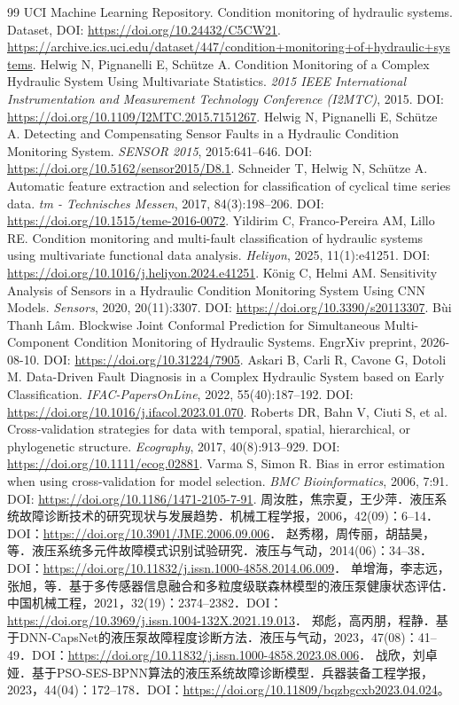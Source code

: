 \documentclass[UTF8,12pt,a4paper]{ctexart}
\begin{document}
\begin{thebibliography}{99}
 UCI Machine Learning Repository. Condition monitoring of hydraulic systems. Dataset, DOI: \url{https://doi.org/10.24432/C5CW21}. \url{https://archive.ics.uci.edu/dataset/447/condition+monitoring+of+hydraulic+systems}.
 Helwig N, Pignanelli E, Schütze A. Condition Monitoring of a Complex Hydraulic System Using Multivariate Statistics. \emph{2015 IEEE International Instrumentation and Measurement Technology Conference (I2MTC)}, 2015. DOI: \url{https://doi.org/10.1109/I2MTC.2015.7151267}.
 Helwig N, Pignanelli E, Schütze A. Detecting and Compensating Sensor Faults in a Hydraulic Condition Monitoring System. \emph{SENSOR 2015}, 2015:641–646. DOI: \url{https://doi.org/10.5162/sensor2015/D8.1}.
 Schneider T, Helwig N, Schütze A. Automatic feature extraction and selection for classification of cyclical time series data. \emph{tm - Technisches Messen}, 2017, 84(3):198–206. DOI: \url{https://doi.org/10.1515/teme-2016-0072}.
 Yildirim C, Franco-Pereira AM, Lillo RE. Condition monitoring and multi-fault classification of hydraulic systems using multivariate functional data analysis. \emph{Heliyon}, 2025, 11(1):e41251. DOI: \url{https://doi.org/10.1016/j.heliyon.2024.e41251}.
 König C, Helmi AM. Sensitivity Analysis of Sensors in a Hydraulic Condition Monitoring System Using CNN Models. \emph{Sensors}, 2020, 20(11):3307. DOI: \url{https://doi.org/10.3390/s20113307}.
 Bùi Thanh Lâm. Blockwise Joint Conformal Prediction for Simultaneous Multi-Component Condition Monitoring of Hydraulic Systems. EngrXiv preprint, 2026-08-10. DOI: \url{https://doi.org/10.31224/7905}.
 Askari B, Carli R, Cavone G, Dotoli M. Data-Driven Fault Diagnosis in a Complex Hydraulic System based on Early Classification. \emph{IFAC-PapersOnLine}, 2022, 55(40):187–192. DOI: \url{https://doi.org/10.1016/j.ifacol.2023.01.070}.
 Roberts DR, Bahn V, Ciuti S, et al. Cross-validation strategies for data with temporal, spatial, hierarchical, or phylogenetic structure. \emph{Ecography}, 2017, 40(8):913–929. DOI: \url{https://doi.org/10.1111/ecog.02881}.
 Varma S, Simon R. Bias in error estimation when using cross-validation for model selection. \emph{BMC Bioinformatics}, 2006, 7:91. DOI: \url{https://doi.org/10.1186/1471-2105-7-91}.
 周汝胜，焦宗夏，王少萍．液压系统故障诊断技术的研究现状与发展趋势．机械工程学报，2006，42(09)：6–14．DOI：\url{https://doi.org/10.3901/JME.2006.09.006}．
 赵秀栩，周传丽，胡喆昊，等．液压系统多元件故障模式识别试验研究．液压与气动，2014(06)：34–38．DOI：\url{https://doi.org/10.11832/j.issn.1000-4858.2014.06.009}．
 单增海，李志远，张旭，等．基于多传感器信息融合和多粒度级联森林模型的液压泵健康状态评估．中国机械工程，2021，32(19)：2374–2382．DOI：\url{https://doi.org/10.3969/j.issn.1004-132X.2021.19.013}．
 郑彪，高丙朋，程静．基于DNN-CapsNet的液压泵故障程度诊断方法．液压与气动，2023，47(08)：41–49．DOI：\url{https://doi.org/10.11832/j.issn.1000-4858.2023.08.006}．
 战欣，刘卓娅．基于PSO-SES-BPNN算法的液压系统故障诊断模型．兵器装备工程学报，2023，44(04)：172–178．DOI：\url{https://doi.org/10.11809/bqzbgcxb2023.04.024}。
\end{thebibliography}
\end{document}
